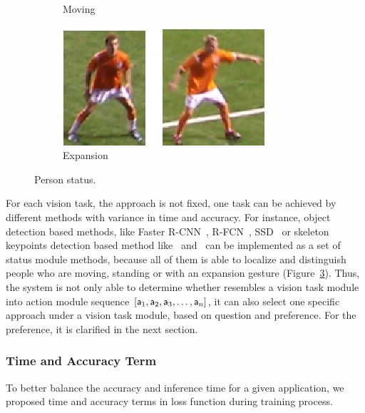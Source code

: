 {\begin{figure}[thb]
\begin{subfigure}[b]{0.127\textwidth}
                \caption{Moving}
                \label{fig:gull2}
        \end{subfigure}\quad
        \begin{subfigure}[b]{0.166\textwidth}
                \includegraphics[width=\linewidth]{figures/expand1.eps}
                \caption{Expansion}
                \label{fig:tiger}
        \end{subfigure}
        \caption{Person status.}\label{fig:Person Status}
\end{figure}
}



For each vision task, the approach is not fixed, one task can be achieved by different methods with variance in time and accuracy. For instance, object detection based methods, like Faster R-CNN~\cite{Ren:2015:FRT:2969239.2969250}, R-FCN~\cite{DBLP:conf/nips/DaiLHS16}, SSD~\cite{DBLP:conf/eccv/LiuAESRFB16} or skeleton keypoints detection based method like~\cite{cao2017realtime} and~\cite{wei2016cpm} can be implemented as a set of status module methods, because all of them is able to localize and distinguish people who are moving, standing or with an expansion gesture (Figure~\ref{fig:Person Status}). Thus, the system is not only able to determine whether resembles a vision task module into action module sequence $[{\mathsf{a}}_1,{\mathsf{a}}_2,{\mathsf{a}}_3,\dots,{\mathsf{a}}_n]$, it can also select one specific approach under a vision task module, based on question and preference. For the preference, it is clarified in the next section.


\subsubsection{Time and Accuracy Term}
\label{sec-TimeAcc}
\hspace{\parindent} To better balance the accuracy and inference time for a given application, we proposed time and accuracy terms in loss function during training process.

